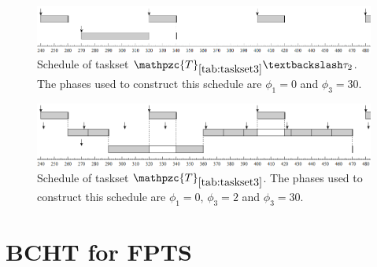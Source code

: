 \documentclass[fleqn]{article}
\begin{document}
\begin{figure}[H]
	\centering
	\includegraphics[width=0.9\linewidth]{figures/fact6_1}
	\caption{Schedule of taskset $\mathpzc{T}_{\ref{tab:taskset3}} \textbackslash \tau_2$. The phases used to construct this schedule are $\phi_1 = 0$ and $\phi_3 = 30$.}
	\label{fig:fact6_1}
\end{figure}

\begin{figure}[H]
	\centering
	\includegraphics[width=0.9\linewidth]{figures/fact6_2}
	\caption{Schedule of taskset $\mathpzc{T}_{\ref{tab:taskset3}}$. The phases used to construct this schedule are $\phi_1 = 0$, $\phi_3 = 2$ and $\phi_3 = 30$.}
	\label{fig:fact6_2}
\end{figure}

\section*{BCHT for FPTS}
\end{document}
